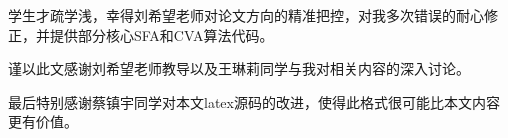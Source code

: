 
\thesisacknowledgement
学生才疏学浅，幸得刘希望老师对论文方向的精准把控，对我多次错误的耐心修正，并提供部分核心SFA和CVA算法代码。

谨以此文感谢刘希望老师教导以及王琳莉同学与我对相关内容的深入讨论。

最后特别感谢蔡镇宇同学对本文latex源码的改进，使得此格式很可能比本文内容更有价值。